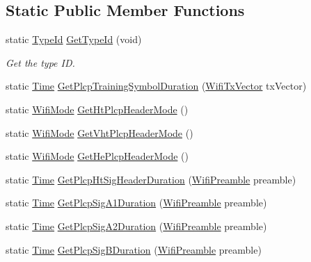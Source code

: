 \subsection*{Static Public Member Functions}
\begin{DoxyCompactItemize}
\item 
static \hyperlink{classns3_1_1TypeId}{Type\+Id} \hyperlink{classns3_1_1WifiPhy_a6ac379a25b68f6a8d72da740b58e0271}{Get\+Type\+Id} (void)
\begin{DoxyCompactList}\small\item\em Get the type ID. \end{DoxyCompactList}\item 
static \hyperlink{classns3_1_1Time}{Time} \hyperlink{classns3_1_1WifiPhy_a5446936c18b66d9fed257a5cd46b25f2}{Get\+Plcp\+Training\+Symbol\+Duration} (\hyperlink{classns3_1_1WifiTxVector}{Wifi\+Tx\+Vector} tx\+Vector)
\item 
static \hyperlink{classns3_1_1WifiMode}{Wifi\+Mode} \hyperlink{classns3_1_1WifiPhy_a525347c5aef8d9181d0a216fa853d939}{Get\+Ht\+Plcp\+Header\+Mode} ()
\item 
static \hyperlink{classns3_1_1WifiMode}{Wifi\+Mode} \hyperlink{classns3_1_1WifiPhy_a6e8d499f550e6cc62312f4fd31643a45}{Get\+Vht\+Plcp\+Header\+Mode} ()
\item 
static \hyperlink{classns3_1_1WifiMode}{Wifi\+Mode} \hyperlink{classns3_1_1WifiPhy_ac03874b0aabf1d54396c79b20d546737}{Get\+He\+Plcp\+Header\+Mode} ()
\item 
static \hyperlink{classns3_1_1Time}{Time} \hyperlink{classns3_1_1WifiPhy_a50354c8f71d8f079b9abb137c2216188}{Get\+Plcp\+Ht\+Sig\+Header\+Duration} (\hyperlink{group__wifi_ga5e94a56cb338a14ffbbb19c6a41251eb}{Wifi\+Preamble} preamble)
\item 
static \hyperlink{classns3_1_1Time}{Time} \hyperlink{classns3_1_1WifiPhy_a545f41e710ce9375848c5728ac9c52a3}{Get\+Plcp\+Sig\+A1\+Duration} (\hyperlink{group__wifi_ga5e94a56cb338a14ffbbb19c6a41251eb}{Wifi\+Preamble} preamble)
\item 
static \hyperlink{classns3_1_1Time}{Time} \hyperlink{classns3_1_1WifiPhy_ab134604019ba3d13398f361ee7632f7e}{Get\+Plcp\+Sig\+A2\+Duration} (\hyperlink{group__wifi_ga5e94a56cb338a14ffbbb19c6a41251eb}{Wifi\+Preamble} preamble)
\item 
static \hyperlink{classns3_1_1Time}{Time} \hyperlink{classns3_1_1WifiPhy_ad8021946079254f3143a1656eb8b33f6}{Get\+Plcp\+Sig\+B\+Duration} (\hyperlink{group__wifi_ga5e94a56cb338a14ffbbb19c6a41251eb}{Wifi\+Preamble} preamble)
\item 

\end{DoxyCompactItemize}
